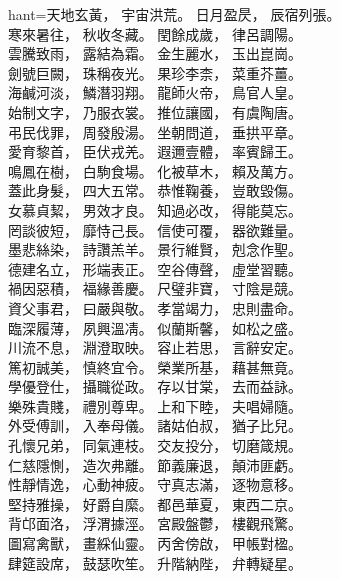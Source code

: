 hant={天地玄黃， 宇宙洪荒。 日月盈昃， 辰宿列張。\\
     寒來暑往， 秋收冬藏。 閏餘成歲， 律呂調陽。\\
     雲騰致雨， 露結為霜。 金生麗水， 玉出崑崗。\\
     劍號巨闕， 珠稱夜光。 果珍李柰， 菜重芥薑。\\
     海鹹河淡， 鱗潛羽翔。 龍師火帝， 鳥官人皇。\\
     始制文字， 乃服衣裳。 推位讓國， 有虞陶唐。\\
     弔民伐罪， 周發殷湯。 坐朝問道， 垂拱平章。\\
     愛育黎首， 臣伏戎羌。 遐邇壹體， 率賓歸王。\\
     鳴鳳在樹， 白駒食場。 化被草木， 賴及萬方。\\
     蓋此身髮， 四大五常。 恭惟鞠養， 豈敢毀傷。\\
     女慕貞絜， 男效才良。 知過必改， 得能莫忘。\\
     罔談彼短， 靡恃己長。 信使可覆， 器欲難量。\\
     墨悲絲染， 詩讚羔羊。 景行維賢， 剋念作聖。\\
     德建名立， 形端表正。 空谷傳聲， 虛堂習聽。\\
     禍因惡積， 福緣善慶。 尺璧非寶， 寸陰是競。\\
     資父事君， 曰嚴與敬。 孝當竭力， 忠則盡命。\\
     臨深履薄， 夙興溫凊。 似蘭斯馨， 如松之盛。\\
     川流不息， 淵澄取映。 容止若思， 言辭安定。\\
     篤初誠美， 慎終宜令。 榮業所基， 藉甚無竟。\\
     學優登仕， 攝職從政。 存以甘棠， 去而益詠。\\
     樂殊貴賤， 禮別尊卑。 上和下睦， 夫唱婦隨。\\
     外受傅訓， 入奉母儀。 諸姑伯叔， 猶子比兒。\\
     孔懷兄弟， 同氣連枝。 交友投分， 切磨箴規。\\
     仁慈隱惻， 造次弗離。 節義廉退， 顛沛匪虧。\\
     性靜情逸， 心動神疲。 守真志滿， 逐物意移。\\
     堅持雅操， 好爵自縻。 都邑華夏， 東西二京。\\
     背邙面洛， 浮渭據涇。 宮殿盤鬱， 樓觀飛驚。\\
     圖寫禽獸， 畫綵仙靈。 丙舍傍啟， 甲帳對楹。\\
     肆筵設席， 鼓瑟吹笙。 升階納陛， 弁轉疑星。\\
}
